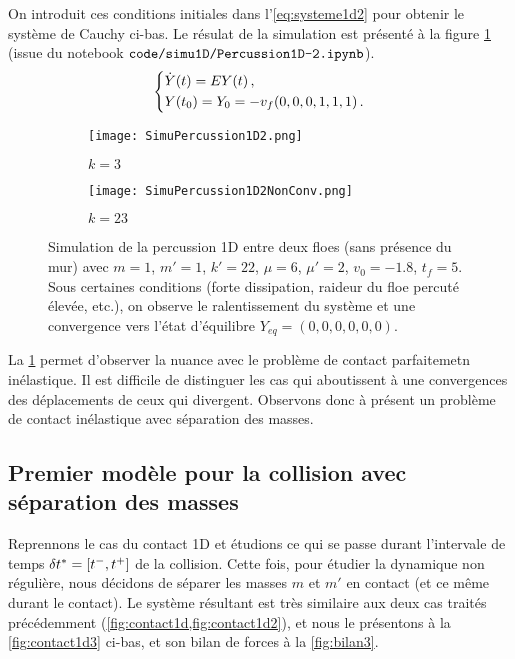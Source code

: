\noindent On introduit ces conditions initiales dans l'\cref{eq:systeme1d2} pour obtenir le système de Cauchy ci-bas. Le résulat de la simulation est présenté à la figure \cref{fig:simucontact1d2} (issue du notebook $\verb|code/simu1D/Percussion1D-2.ipynb|$). 
\begin{align} \label{eq:systeme1d3}
    \begin{dcases}
        \dot{Y}(t)= E Y(t) \,, \\
        Y(t_0) = Y_0 = -v_f(0,0,0,1,1,1) \,.        
    \end{dcases}
\end{align}

\begin{figure}[!h]
    \centering
    \begin{subfigure}{0.45\textwidth}
        \centering
        \texttt{[image: SimuPercussion1D2.png]}
        \caption{$k=3$}
    \end{subfigure}
    \begin{subfigure}{0.45\textwidth}
        \centering
        \texttt{[image: SimuPercussion1D2NonConv.png]}
        \caption{$k=23$}
    \end{subfigure}

    \caption{Simulation de la percussion 1D entre deux floes (sans présence du mur) avec $m=1$, $m'=1$, $k'=22$, $\mu=6$, $\mu'=2$, $v_0=-1.8$, $t_{f}=5$. Sous certaines conditions (forte dissipation, raideur du floe percuté élevée, etc.), on observe le ralentissement du système et une convergence vers l'état d'équilibre $Y_{eq}=(0,0,0,0,0,0)$.} 
    \label{fig:simucontact1d2}
\end{figure}

\noindent La \cref{fig:simucontact1d2} permet d'observer la nuance avec le problème de contact parfaitemetn inélastique. Il est difficile de distinguer les cas qui aboutissent à une convergences des déplacements de ceux qui divergent. Observons donc à présent un problème de contact inélastique avec séparation des masses.






\subsection{Premier modèle pour la collision avec séparation des masses}
\label{subsubsec:colinesepma}

Reprennons le cas du contact 1D et étudions ce qui se passe durant l'intervale de temps $\delta t^{*} = [t^{-}, t^{+}]$ de la collision. Cette fois, pour étudier la dynamique non régulière, nous décidons de séparer les masses $m$ et $m'$ en contact (et ce même durant le contact). Le système résultant est très similaire aux deux cas traités précédemment (\cref{fig:contact1d,fig:contact1d2}), et nous le présentons à la \cref{fig:contact1d3} ci-bas, et son bilan de forces à la \cref{fig:bilan3}.

